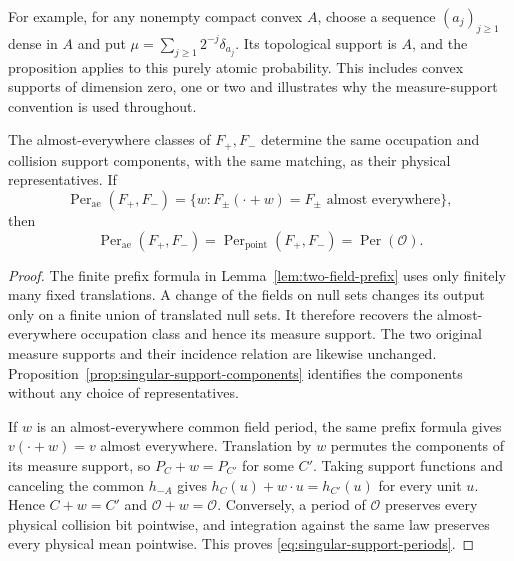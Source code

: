 For example, for any nonempty compact convex $A$, choose a sequence
$(a_j)_{j\ge1}$ dense in $A$ and put
$\mu=\sum_{j\ge1}2^{-j}\delta_{a_j}$.
Its topological support is $A$, and the proposition applies to this
purely atomic probability. This includes convex supports of dimension
zero, one or two and illustrates why the measure-support convention
is used throughout.

\begin{corollary}
\label{cor:singular-support-ae-periods}
The almost-everywhere classes of $F_+,F_-$ determine the same
occupation and collision support components, with the same
matching, as their physical representatives.  If
\[
 \operatorname{Per}_{\mathrm{ae}}(F_+,F_-)
 =\{w:F_\pm(\cdot+w)=F_\pm\text{ almost everywhere}\},
\]
then
\begin{equation}\label{eq:singular-support-periods}
 \operatorname{Per}_{\mathrm{ae}}(F_+,F_-)
 =\operatorname{Per}_{\mathrm{point}}(F_+,F_-)
 =\operatorname{Per}(\mathcal O).
\end{equation}
\end{corollary}
\begin{proof}
The finite prefix formula in Lemma~\ref{lem:two-field-prefix}
uses only finitely many fixed translations.  A change of the
fields on null sets changes its output only on a finite union
of translated null sets.  It therefore recovers the
almost-everywhere occupation class and hence its measure support.
The two original measure supports and their incidence relation
are likewise unchanged.  Proposition~\ref{prop:singular-support-components}
identifies the components without any choice of representatives.

If $w$ is an almost-everywhere common field period, the same
prefix formula gives $v(\cdot+w)=v$ almost everywhere.
Translation by $w$ permutes the components of its measure
support, so $P_C+w=P_{C'}$ for some $C'$.  Taking support
functions and canceling the common $h_{-A}$ gives
$h_C(u)+w\cdot u=h_{C'}(u)$ for every unit $u$.
Hence $C+w=C'$ and $\mathcal O+w=\mathcal O$.
Conversely, a period of $\mathcal O$ preserves every physical
collision bit pointwise, and integration against the same law
preserves every physical mean pointwise.  This proves
\eqref{eq:singular-support-periods}.
\end{proof}

